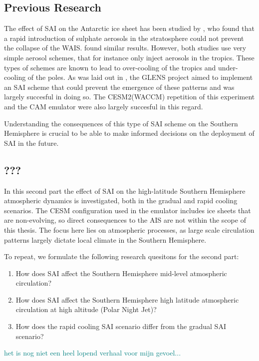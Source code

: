 \subsection{Previous Research}
The effect of SAI on the Antarctic ice sheet has been studied by \textcite{mccusker2015}, who found that a rapid introduction of sulphate aerosols in the stratosphere could not prevent the collapse of the WAIS. \textcite{sutter2023} found similar results. However, both studies use very simple aerosol schemes, that for instance only inject aerosols in the tropics. These types of schemes are known to lead to over-cooling of the tropics and under-cooling of the poles. As was laid out in \textcite{tilmes2020}, the GLENS project aimed to implement an SAI scheme that could prevent the emergence of these patterns and was largely succesful in doing so. The CESM2(WACCM) repetition of this experiment and the
CAM emulator were also largely succesful in this regard.

Understanding the consequences of this type of SAI scheme on the Southern Hemisphere is crucial to be able to make informed decisions on the deployment of SAI in the future. 

\subsection{???}
In this second part the effect of SAI on the high-latitude Southern Hemisphere atmospheric dynamics is investigated, both in the gradual and rapid cooling scenarios. The CESM configuration used in the emulator includes ice sheets that are non-evolving, so direct consequences to the AIS are not within the scope of this thesis. The focus here lies on atmospheric processes, as large scale circulation patterns largely dictate local climate in the Southern Hemisphere.

To repeat, we formulate the following research quesitons for the second part:

\begin{enumerate}
    \item How does SAI affect the Southern Hemisphere mid-level atmospheric circulation?
    \item How does SAI affect the Southern Hemisphere high latitude atmospheric circulation at high altitude (Polar Night Jet)?
    \item How does the rapid cooling SAI scenario differ from the gradual SAI scenario?
\end{enumerate}

\textcolor{teal}{het is nog niet een heel lopend verhaal voor mijn gevoel...}